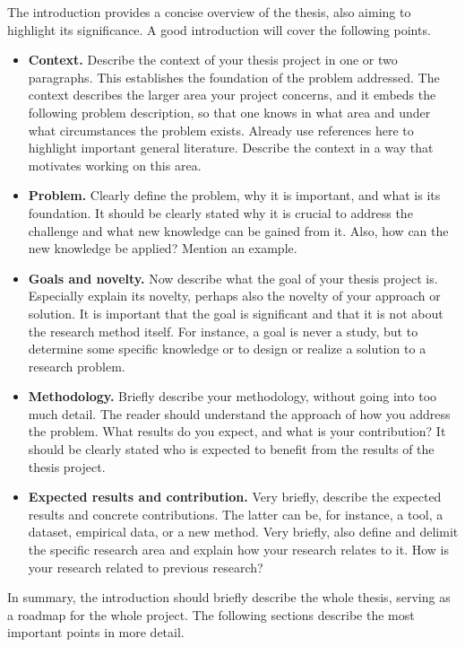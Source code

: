 The introduction provides a concise overview of the thesis, also aiming to highlight its significance. A good introduction will cover the following points.
\begin{itemize}
	\item \textbf{Context.} Describe the context of your thesis project in one or two paragraphs. This establishes the foundation of the problem addressed. The context describes the larger area your project concerns, and it embeds the following problem description, so that one knows in what area and under what circumstances the problem exists. Already use references here to highlight important general literature. Describe the context in a way that motivates working on this area. 
	\item \textbf{Problem.} Clearly define the problem, why it is important, and what is its foundation. It should be clearly stated why it is crucial to address the challenge and what new knowledge can be gained from it. Also, how can the new knowledge be applied? Mention an example.
	\item \textbf{Goals and novelty.} Now describe what the goal of your thesis project is. Especially explain its novelty, perhaps also the novelty of your approach or solution. It is important that the goal is significant and that it is not about the research method itself. For instance, a goal is never a study, but to determine some specific knowledge or to design or realize a solution to a research problem. 
	\item \textbf{Methodology.} Briefly describe your methodology, without going into too much detail. The reader should understand the approach of how you address the problem. What results do you expect, and what is your contribution? It should be clearly stated who is expected to benefit from the results of the thesis project.
	\item \textbf{Expected results and contribution.} Very briefly, describe the expected results and concrete contributions. The latter can be, for instance, a tool, a dataset, empirical data, or a new method. Very briefly, also define and delimit the specific research area and explain how your research relates to it. How is your research related to previous research?
\end{itemize}

\noindent In summary, the introduction should briefly describe the whole thesis, serving as a roadmap for the whole project. The following sections describe the most important points in more detail.



